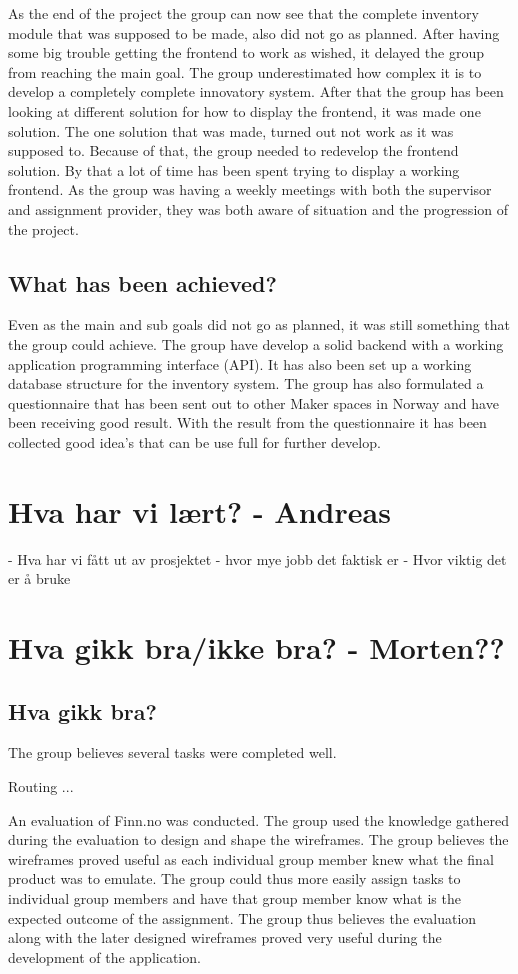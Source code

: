 As the end of the project the group can now see that the complete inventory module that was supposed to be made, also did not go as planned. After having some big trouble getting the frontend to work as wished, it delayed the group from reaching the main goal. The group underestimated how complex it is to develop a completely complete innovatory system. After that the group has been looking at different 
solution for how to display the frontend, it was made one solution. The one solution that was made, turned out not work as it was supposed to. Because of that, the group needed to redevelop the frontend 
solution. By that a lot of time has been spent trying to display a working frontend. As the group was having a weekly meetings with both the supervisor and assignment provider, they was both aware of situation and the progression of the project. 

\subsection{What has been achieved?}
Even as the main and sub goals did not go as planned, it was still something that the group could achieve. The group have develop a solid backend with a working application programming interface (API). It has also been set up a working database structure for the inventory system. The group has also 
formulated a questionnaire that has been sent out to other Maker spaces in Norway and have been receiving good result. With the result from the questionnaire it has been collected good idea's that can be use full for further develop.

\section{Hva har vi lært? - Andreas}
- Hva har vi fått ut av prosjektet
- hvor mye jobb det faktisk er
- Hvor viktig det er å bruke 

\section{Hva gikk bra/ikke bra? - Morten??}
\subsection{Hva gikk bra?}
The group believes several tasks were completed well.

Routing ...

An evaluation of Finn.no was conducted.
The group used the knowledge gathered during the evaluation to design and shape the wireframes.
The group believes the wireframes proved useful as each individual group member knew what the final product was to emulate.
The group could thus more easily assign tasks to individual group members and have that group member know what is the expected outcome of the assignment.
The group thus believes the evaluation along with the later designed wireframes proved very useful during the development of the application. 

